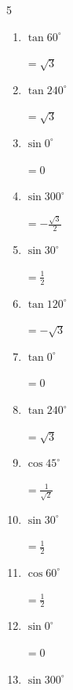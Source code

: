 \begin{multicols}{5}
\begin{enumerate}
        $\displaystyle =-\frac{1}{\sqrt{3}}$

  \item $\displaystyle \tan{60^\circ}$

        $\displaystyle =\sqrt{3}$

  \item $\displaystyle \tan{240^\circ}$

        $\displaystyle =\sqrt{3}$

  \item $\displaystyle \sin{0^\circ}$

        $\displaystyle =0$

  \item $\displaystyle \sin{300^\circ}$

        $\displaystyle =-\frac{\sqrt{3}}{2}$

\columnbreak %

  \item $\displaystyle \sin{30^\circ}$

        $\displaystyle =\frac{1}{2}$

  \item $\displaystyle \tan{120^\circ}$

        $\displaystyle =-\sqrt{3}$

  \item $\displaystyle \tan{0^\circ}$

        $\displaystyle =0$

  \item $\displaystyle \tan{240^\circ}$

        $\displaystyle =\sqrt{3}$

  \item $\displaystyle \cos{45^\circ}$

        $\displaystyle =\frac{1}{\sqrt{2}}$

  \item $\displaystyle \sin{30^\circ}$

        $\displaystyle =\frac{1}{2}$

  \item $\displaystyle \cos{60^\circ}$

        $\displaystyle =\frac{1}{2}$

  \item $\displaystyle \sin{0^\circ}$

        $\displaystyle =0$

  \item $\displaystyle \sin{300^\circ}$


\end{enumerate}
\end{multicols}
